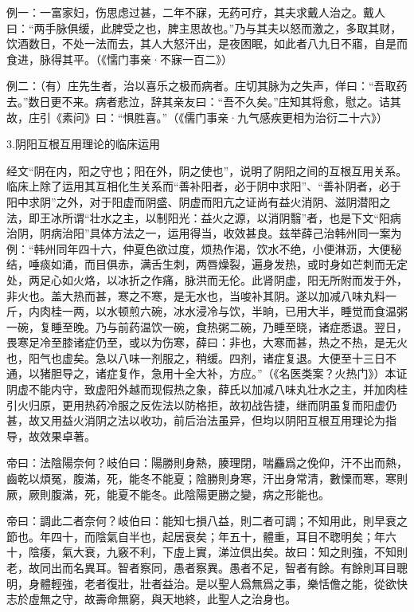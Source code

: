 \documentclass[12pt]{ctexbook}
\begin{document}
例一：一富家妇，伤思虑过甚，二年不寐，无药可疗，其夫求戴人治之。戴人曰：“两手脉俱缓，此脾受之也，脾主思故也。”乃与其夫以怒而激之，多取其财，饮酒数日，不处一法而去，其人大怒汗出，是夜困眠，如此者八九日不寤，自是而食进，脉得其平。（《懦门事亲·不寐一百二》）

例二：（有）庄先生者，治以喜乐之极而病者。庄切其脉为之失声，佯曰：“吾取药去。”数日更不来。病者悲泣，辞其亲友曰：“吾不久矣。”庄知其将愈，慰之。诘其故，庄引《素问》曰：“惧胜喜。”（《儒门事亲·九气感疾更相为治衍二十六》）

3.阴阳互根互用理论的临床运用

经文“阴在内，阳之守也；阳在外，阴之使也”，说明了阴阳之间的互根互用关系。临床上除了运用其互相化生关系而“善补阳者，必于阴中求阳”、“善补阴者，必于阳中求阴”之外，对于阳虚而阴盛、阴虚而阳亢之证尚有益火消阴、滋阴潜阳之法，即王冰所谓“壮水之主，以制阳光：益火之源，以消阴翳”者，也是下文“阳病治阴，阴病治阳”具体方法之一，运用得当，收效甚良。兹举薛己治韩州同一案为例：“韩州同年四十六，仲夏色欲过度，烦热作渴，饮水不绝，小便淋沥，大便秘结，唾痰如涌，而目俱赤，满舌生刺，两唇燥裂，遍身发热，或时身如芒刺而无定处，两足心如火烙，以冰折之作痛，脉洪而无伦。此肾阴虚，阳无所附而发于外，非火也。盖大热而甚，寒之不寒，是无水也，当唆补其阴。遂以加减八味丸料一斤，内肉桂一两，以水顿煎六碗，冰水浸冷与饮，半晌，已用大半，睡觉而食温粥一碗，复睡至晚。乃与前药温饮一碗，食热粥二碗，乃睡至晓，诸症悉退。翌日，畏寒足冷至膝诸症仍至，或以为伤寒，薛曰：非也，大寒而甚，热之不热，是无火也，阳气也虚矣。急以八味一剂服之，稍缓。四剂，诸症复退。大便至十三日不通，以猪胆导之，诸症复作，急用十全大补，方应。”（《名医类案？火热门》）本证阴虚不能内守，致虚阳外越而现假热之象，薛氏以加减八味丸壮水之主，并加肉桂引火归原，更用热药冷服之反佐法以防格拒，故初战告捷，继而阴虽复而阳虚仍甚，故又用益火消阴之法以收功，前后治法虽异，但均以阴阳互根互用理论为指导，故效果卓著。


\begin{yuanwen}
帝曰：法陰陽奈何？岐伯曰：陽勝則身熱，腠理閉，喘麤爲之俛仰，汗不出而熱，齒乾以煩冤，腹滿，死，能冬不能夏；陰勝則身寒，汗出身常清，數慄而寒，寒則厥，厥則腹滿，死，能夏不能冬。此陰陽更勝之變，病之形能也。

帝曰：調此二者奈何？岐伯曰：能知七損八益，則二者可調；不知用此，則早衰之節也。年四十，而陰氣自半也，起居衰矣；年五十，體重，耳目不聦明矣；年六十，陰痿，氣大衰，九竅不利，下虛上實，涕泣倶出矣。故曰：知之則強，不知則老，故同出而名異耳。智者察同，愚者察異。愚者不足，智者有餘。有餘則耳目聰明，身體輕強，老者復壯，壯者益治。是以聖人爲無爲之事，樂恬儋之能，從欲快志於虛無之守，故壽命無窮，與天地終，此聖人之治身也。
\end{yuanwen}
\end{document}
